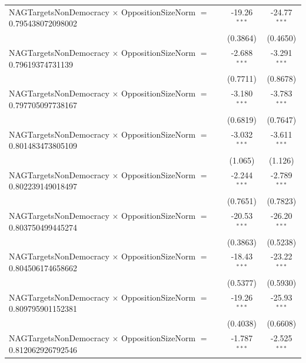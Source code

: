 \begin{tabular}{lcc}
   NAGTargetsNonDemocracy $\times$ OppositionSizeNorm $=$ 0.795438072098002     & -19.26$^{***}$       & -24.77$^{***}$\\   
                                                                                & (0.3864)             & (0.4650)\\   
   NAGTargetsNonDemocracy $\times$ OppositionSizeNorm $=$ 0.79619374731139      & -2.688$^{***}$       & -3.291$^{***}$\\   
                                                                                & (0.7711)             & (0.8678)\\   
   NAGTargetsNonDemocracy $\times$ OppositionSizeNorm $=$ 0.797705097738167     & -3.180$^{***}$       & -3.783$^{***}$\\   
                                                                                & (0.6819)             & (0.7647)\\   
   NAGTargetsNonDemocracy $\times$ OppositionSizeNorm $=$ 0.801483473805109     & -3.032$^{***}$       & -3.611$^{***}$\\   
                                                                                & (1.065)              & (1.126)\\   
   NAGTargetsNonDemocracy $\times$ OppositionSizeNorm $=$ 0.802239149018497     & -2.244$^{***}$       & -2.789$^{***}$\\   
                                                                                & (0.7651)             & (0.7823)\\   
   NAGTargetsNonDemocracy $\times$ OppositionSizeNorm $=$ 0.803750499445274     & -20.53$^{***}$       & -26.20$^{***}$\\   
                                                                                & (0.3863)             & (0.5238)\\   
   NAGTargetsNonDemocracy $\times$ OppositionSizeNorm $=$ 0.804506174658662     & -18.43$^{***}$       & -23.22$^{***}$\\   
                                                                                & (0.5377)             & (0.5930)\\   
   NAGTargetsNonDemocracy $\times$ OppositionSizeNorm $=$ 0.809795901152381     & -19.26$^{***}$       & -25.93$^{***}$\\   
                                                                                & (0.4038)             & (0.6608)\\   
   NAGTargetsNonDemocracy $\times$ OppositionSizeNorm $=$ 0.812062926792546     & -1.787$^{***}$       & -2.525$^{***}$\\   

\end{tabular}
